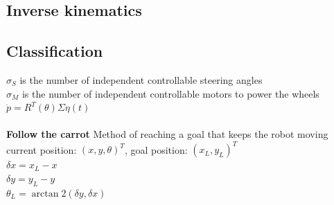 \documentclass[12pt]{article}
\begin{document}
	\subsection{Inverse kinematics}
	\subsection{Classification}
	$\sigma_S$ is the number of independent controllable steering angles\\
	$\sigma_M$ is the number of independent controllable motors to power the wheels\\
	$\dot{p} = R^T(\theta) \Sigma \eta(t)$\\
	\\
	\textbf{Follow the carrot} Method of reaching a goal that keeps the robot moving\\
	current position: $(x, y, \theta)^T$, goal position: $(x_L, y_L)^T$\\
	$\delta x = x_L - x$\\
	$\delta y = y_L - y$\\
	$\theta_L = \arctan2(\delta y, \delta x)$
\end{document}
